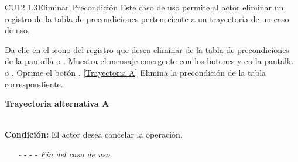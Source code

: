 	\begin{UseCase}{CU12.1.3}{Eliminar Precondición}{
		Este caso de uso permite al actor eliminar un registro de la tabla de precondiciones perteneciente a un trayectoria de un caso de uso.
	}
\end{UseCase}
\begin{UCtrayectoria}
	\UCpaso[\UCactor] Da clic en el icono \eliminar del registro que desea eliminar de la tabla de precondiciones de la pantalla  o .
	\UCpaso[\UCsist] Muestra el mensaje emergente  con los botones  y  en la pantalla  o .
	\UCpaso[\UCactor] Oprime el botón . \hyperlink{CU12-1-3:TAA}{[Trayectoria A]}
	\UCpaso[\UCsist] Elimina la precondición de la tabla correspondiente.
\end{UCtrayectoria}		
\hypertarget{CU12-1-3:TAA}{\textbf{Trayectoria alternativa A}}\\
\noindent \textbf{Condición:} El actor desea cancelar la operación.
\begin{enumerate}
	\UCpaso[\UCactor] Solicita cancelar la operación oprimiendo el botón  de la pantalla .
	\UCpaso[\UCsist] Muestra la pantalla  o .
	\item[- -] - - {\em {Fin del caso de uso}}.%
\end{enumerate}


